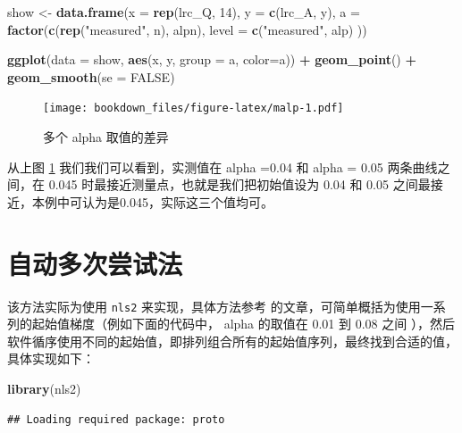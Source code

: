 \documentclass[
]{krantz}
\makeatletter
\newenvironment{Shaded}{\begin{snugshade}}{\end{snugshade}}
\newcommand{\DataTypeTok}[1]{\textcolor[rgb]{0.13,0.29,0.53}{#1}}
\newcommand{\DecValTok}[1]{\textcolor[rgb]{0.00,0.00,0.81}{#1}}
\newcommand{\KeywordTok}[1]{\textcolor[rgb]{0.13,0.29,0.53}{\textbf{#1}}}
\newcommand{\NormalTok}[1]{#1}
\newcommand{\OperatorTok}[1]{\textcolor[rgb]{0.81,0.36,0.00}{\textbf{#1}}}
\newcommand{\OtherTok}[1]{\textcolor[rgb]{0.56,0.35,0.01}{#1}}
\newcommand{\StringTok}[1]{\textcolor[rgb]{0.31,0.60,0.02}{#1}}
\newenvironment{kframe}{%
\medskip{}
\setlength{\fboxsep}{.8em}
 \def\at@end@of@kframe{}%
 \ifinner\ifhmode%
  \def\at@end@of@kframe{\end{minipage}}%
  \begin{minipage}{\columnwidth}%
 \fi\fi%
 \def\FrameCommand##1{\hskip\@totalleftmargin \hskip-\fboxsep
 \colorbox{shadecolor}{##1}\hskip-\fboxsep
     \hskip-\linewidth \hskip-\@totalleftmargin \hskip\columnwidth}%
 \MakeFramed {\advance\hsize-\width
   \@totalleftmargin\z@ \linewidth\hsize
   \@setminipage}}%
 {\par\unskip\endMakeFramed%
 \at@end@of@kframe}
\renewenvironment{Shaded}{\begin{kframe}}{\end{kframe}}
\makeatother
\begin{document}
\begin{Shaded}
\begin{Highlighting}[]
\NormalTok{show <-}\StringTok{ }\KeywordTok{data.frame}\NormalTok{(}\DataTypeTok{x =} \KeywordTok{rep}\NormalTok{(lrc_Q, }\DecValTok{14}\NormalTok{),}
           \DataTypeTok{y =} \KeywordTok{c}\NormalTok{(lrc_A, y), }
           \DataTypeTok{a =} \KeywordTok{factor}\NormalTok{(}\KeywordTok{c}\NormalTok{(}\KeywordTok{rep}\NormalTok{(}\StringTok{"measured"}\NormalTok{, n), alpn),}
           \DataTypeTok{level =} \KeywordTok{c}\NormalTok{(}\StringTok{"measured"}\NormalTok{, alp)}
\NormalTok{             ))}

\KeywordTok{ggplot}\NormalTok{(}\DataTypeTok{data =}\NormalTok{ show, }\KeywordTok{aes}\NormalTok{(x, y, }\DataTypeTok{group =}\NormalTok{ a, }\DataTypeTok{color=}\NormalTok{a)) }\OperatorTok{+}\StringTok{ }
\StringTok{  }\KeywordTok{geom_point}\NormalTok{() }\OperatorTok{+}\StringTok{ }
\StringTok{  }\KeywordTok{geom_smooth}\NormalTok{(}\DataTypeTok{se =} \OtherTok{FALSE}\NormalTok{) }
\end{Highlighting}
\end{Shaded}

\begin{figure}
\centering
\texttt{[image: bookdown\_files/figure-latex/malp-1.pdf]}
\caption{\label{fig:malp}多个 alpha 取值的差异}
\end{figure}

从上图 \ref{fig:malp} 我们我们可以看到，实测值在 alpha =0.04 和 alpha = 0.05 两条曲线之间，在 0.045 时最接近测量点，也就是我们把初始值设为 0.04 和 0.05 之间最接近，本例中可认为是0.045，实际这三个值均可。

\hypertarget{mult_try}{%
\section{自动多次尝试法}\label{mult_try}}

该方法实际为使用 \texttt{nls2} 来实现，具体方法参考 \citet{nls2} 的文章，可简单概括为使用一系列的起始值梯度（例如下面的代码中， alpha 的取值在 0.01 到 0.08 之间 ），然后软件循序使用不同的起始值，即排列组合所有的起始值序列，最终找到合适的值，具体实现如下：

\begin{Shaded}
\begin{Highlighting}[]
\KeywordTok{library}\NormalTok{(nls2)}
\end{Highlighting}
\end{Shaded}

\begin{verbatim}
## Loading required package: proto
\end{verbatim}
\end{document}
